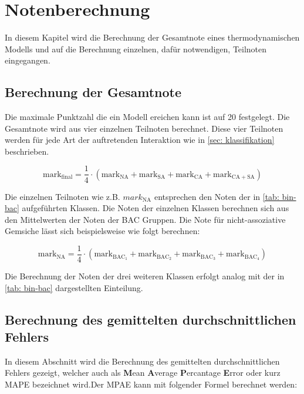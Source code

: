 \documentclass[../thesis.tex]{subfiles}
\begin{document}
\section{Notenberechnung}

In diesem Kapitel wird die Berechnung der Gesamtnote eines thermodynamischen Modells und auf die Berechnung einzelnen, dafür notwendigen, Teilnoten eingegangen.

\subsection{Berechnung der Gesamtnote}
Die maximale Punktzahl die ein Modell ereichen kann ist auf 20 festgelegt. Die Gesamtnote wird aus vier einzelnen Teilnoten berechnet. Diese vier Teilnoten werden für jede Art der auftretenden Interaktion wie in \autoref{sec: klassifikation} beschrieben.

\begin{equation}
	\mathrm{mark}_{\mathrm{final}} = \dfrac{1}{4} \cdot \left( 
		\mathrm{mark}_{\mathrm{NA}} + \mathrm{mark}_{\mathrm{SA}} + \mathrm{mark}_{\mathrm{CA}} + \mathrm{mark}_{\mathrm{CA + SA}} 
	 \right)
\end{equation}

Die einzelnen Teilnoten wie z.B. $mark_{\mathrm{NA}}$ entsprechen den Noten der in \autoref{tab: bin-bac} aufgeführten Klassen. Die Noten der einzelnen Klassen berechnen sich aus den Mittelwerten der Noten der BAC Gruppen. Die Note für nicht-assoziative Gemsiche lässt sich beispielsweise wie folgt berechnen:

\begin{equation}
	\mathrm{mark}_{\mathrm{NA}} = \dfrac{1}{4} \cdot \left(
		\mathrm{mark}_{\mathrm{BAC_1}} + \mathrm{mark}_{\mathrm{BAC_2}} + \mathrm{mark}_{\mathrm{BAC_3}} + \mathrm{mark}_{\mathrm{BAC_4}}
	\right)
\end{equation}

Die Berechnung der Noten der drei weiteren Klassen erfolgt analog mit der in \autoref{tab: bin-bac} dargestellten Einteilung.

\subsection{Berechnung des gemittelten durchschnittlichen Fehlers}
In diesem Abschnitt wird die Berechnung des gemittelten durchschnittlichen Fehlers gezeigt, welcher auch als \textbf{M}ean \textbf{A}verage \textbf{P}ercantage \textbf{E}rror oder kurz MAPE bezeichnet wird.Der MPAE kann mit folgender Formel berechnet werden:
\end{document}
